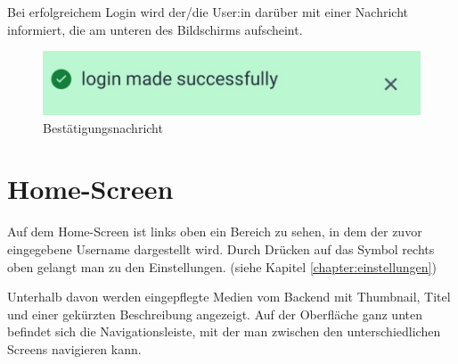 Bei erfolgreichem Login wird der/die User:in darüber mit einer Nachricht informiert, die am unteren des Bildschirms
aufscheint.

\begin{figure}[H]
    \centering
    \includegraphics[height=0.09\textwidth]{./pics/message_cut.jpg}
    \caption{Bestätigungsnachricht}
\end{figure}

\section{Home-Screen}

Auf dem Home-Screen ist links oben ein Bereich zu sehen, in dem der zuvor eingegebene Username dargestellt wird. 
Durch Drücken auf das Symbol rechts
oben gelangt man zu den Einstellungen. (siehe Kapitel \ref{chapter:einstellungen})

Unterhalb davon werden eingepflegte Medien vom Backend mit Thumbnail, Titel und einer gekürzten Beschreibung angezeigt.
Auf der Oberfläche ganz unten befindet sich die Navigationsleiste, mit der man zwischen den unterschiedlichen Screens
navigieren kann.


